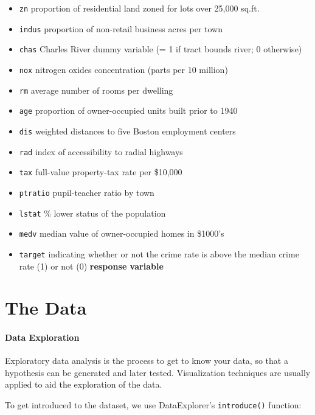 \documentclass[3p]{elsarticle} %
\providecommand{\tightlist}{%
  \setlength{\itemsep}{0pt}\setlength{\parskip}{0pt}}
\begin{document}
\begin{itemize}
\tightlist
\item
  \texttt{zn} proportion of residential land zoned for lots over 25,000
  sq.ft.
\item
  \texttt{indus} proportion of non-retail business acres per town
\item
  \texttt{chas} Charles River dummy variable (= 1 if tract bounds river;
  0 otherwise)
\item
  \texttt{nox} nitrogen oxides concentration (parts per 10 million)
\item
  \texttt{rm} average number of rooms per dwelling
\item
  \texttt{age} proportion of owner-occupied units built prior to 1940
\item
  \texttt{dis} weighted distances to five Boston employment centers
\item
  \texttt{rad} index of accessibility to radial highways
\item
  \texttt{tax} full-value property-tax rate per \$10,000
\item
  \texttt{ptratio} pupil-teacher ratio by town
\item
  \texttt{lstat} \% lower status of the population
\item
  \texttt{medv} median value of owner-occupied homes in \$1000's
\item
  \texttt{target} indicating whether or not the crime rate is above the
  median crime rate (1) or not (0) \textbf{response variable}
\end{itemize}

\newpage

\hypertarget{the-data}{%
\section{The Data}\label{the-data}}

\hypertarget{data-exploration}{%
\paragraph{Data Exploration}\label{data-exploration}}

Exploratory data analysis is the process to get to know your data, so
that a hypothesis can be generated and later tested. Visualization
techniques are usually applied to aid the exploration of the data.

To get introduced to the dataset, we use DataExplorer's
\texttt{introduce()} function:
\end{document}
